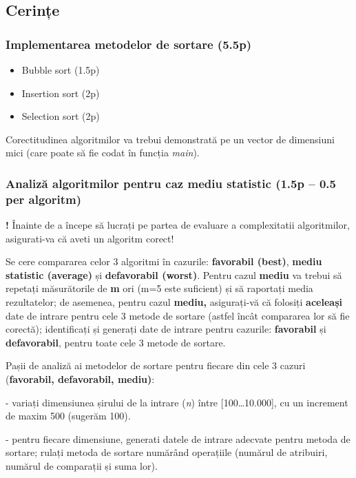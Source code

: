 \documentclass[../ro-fa-lab.tex]{subfiles}
\begin{document}
\subsection{Cerințe}\label{cerinux21be}

\subsubsection{Implementarea metodelor de sortare
(5.5p)}\label{implementarea-metodelor-de-sortare-5.5p}

\begin{itemize}
\item
  Bubble sort (1.5p)
\item
  Insertion sort (2p)
\item
  Selection sort (2p)
\end{itemize}

Corectitudinea algoritmilor va trebui demonstrată pe un vector de
dimensiuni mici (care poate să fie codat în funcția \emph{main}).

\subsubsection{Analiză algoritmilor pentru caz mediu statistic (1.5p -- 0.5
per
algoritm)}\label{analizux103-algoritmilor-pentru-caz-mediu-statistic-1.5p-0.5-per-algoritm}

\textbf{!} Înainte de a începe să lucrați pe partea de evaluare a
complexitatii algoritmilor, asigurati-va că aveti un algoritm corect!

Se cere compararea celor 3 algoritmi în cazurile: \textbf{favorabil
(best)}, \textbf{mediu statistic (average)} și \textbf{defavorabil
(worst)}. Pentru cazul \textbf{mediu} va trebui să repetați măsurătorile
de \textbf{m} ori (m=5 este suficient) și să raportați media
rezultatelor; de asemenea, pentru cazul \textbf{mediu,} asigurați-vă că
folosiți \textbf{aceleași} date de intrare pentru cele 3 metode de
sortare (astfel încât compararea lor să fie corectă); identificați și
generați date de intrare pentru cazurile: \textbf{favorabil} și
\textbf{defavorabil}, pentru toate cele 3 metode de sortare.

Pașii de analiză ai metodelor de sortare pentru fiecare din cele 3
cazuri (\textbf{favorabil, defavorabil, mediu)}:

- variați dimensiunea șirului de la intrare (\emph{n}) între
{[}100\ldots10.000{]}, cu un increment de maxim 500 (sugerăm 100).

- pentru fiecare dimensiune, generati datele de intrare adecvate pentru
metoda de sortare; rulați metoda de sortare numărând operațiile (numărul
de atribuiri, numărul de comparații și suma lor).
\end{document}
